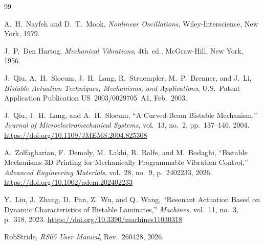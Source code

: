 \documentclass[11pt,letterpaper]{article}
\begin{document}
\begin{thebibliography}{99}

A.~H.~Nayfeh and D.~T.~Mook,
\textit{Nonlinear Oscillations},
Wiley-Interscience, New York, 1979.

J.~P.~Den Hartog,
\textit{Mechanical Vibrations}, 4th~ed.,
McGraw-Hill, New York, 1956.

J.~Qiu, A.~H.~Slocum, J.~H.~Lang, R.~Struempler, M.~P.~Brenner, and J.~Li,
\textit{Bistable Actuation Techniques, Mechanisms, and Applications},
U.S.\ Patent Application Publication US~2003/0029705~A1,
Feb.\ 2003.

J.~Qiu, J.~H.~Lang, and A.~H.~Slocum,
``A Curved-Beam Bistable Mechanism,''
\textit{Journal of Microelectromechanical Systems}, vol.~13, no.~2,
pp.~137--146, 2004.
\url{https://doi.org/10.1109/JMEMS.2004.825308}

A.~Zolfagharian, F.~Demoly, M.~Lakhi, B.~Rolfe, and M.~Bodaghi,
``Bistable Mechanisms 3D Printing for Mechanically Programmable Vibration Control,''
\textit{Advanced Engineering Materials}, vol.~28, no.~9, p.~2402233, 2026.
\url{https://doi.org/10.1002/adem.202402233}

Y.~Liu, J.~Zhang, D.~Pan, Z.~Wu, and Q.~Wang,
``Resonant Actuation Based on Dynamic Characteristics of Bistable Laminates,''
\textit{Machines}, vol.~11, no.~3, p.~318, 2023.
\url{https://doi.org/10.3390/machines11030318}

RobStride,
\textit{RS05 User Manual}, Rev.~260428, 2026.

\end{thebibliography}
\end{document}
